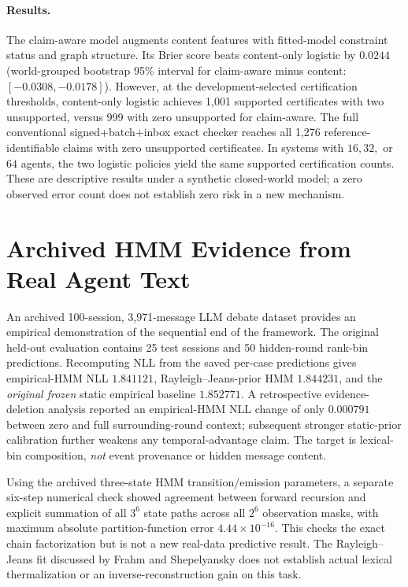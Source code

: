 \documentclass[10pt,twocolumn]{article}
\begin{document}
\paragraph{Results.} The claim-aware model augments content features with fitted-model constraint status and graph structure. Its Brier score beats content-only logistic by $0.0244$ (world-grouped bootstrap 95\% interval for claim-aware minus content: $[-0.0308,-0.0178]$). However, at the development-selected certification thresholds, content-only logistic achieves 1,001 supported certificates with two unsupported, versus 999 with zero unsupported for claim-aware. The full conventional signed+batch+inbox exact checker reaches all 1,276 reference-identifiable claims with zero unsupported certificates. In systems with $16,32,$ or $64$ agents, the two logistic policies yield the same supported certification counts. These are descriptive results under a synthetic closed-world model; a zero observed error count does not establish zero risk in a new mechanism.


\section{Archived HMM Evidence from Real Agent Text}
An archived 100-session, 3,971-message LLM debate dataset provides an empirical demonstration of the sequential end of the framework. The original held-out evaluation contains 25 test sessions and 50 hidden-round rank-bin predictions. Recomputing NLL from the saved per-case predictions gives empirical-HMM NLL $1.841121$, Rayleigh--Jeans-prior HMM $1.844231$, and the \emph{original frozen} static empirical baseline $1.852771$. A retrospective evidence-deletion analysis reported an empirical-HMM NLL change of only $0.000791$ between zero and full surrounding-round context; subsequent stronger static-prior calibration further weakens any temporal-advantage claim. The target is lexical-bin composition, \emph{not} event provenance or hidden message content.

Using the archived three-state HMM transition/emission parameters, a separate six-step numerical check showed agreement between forward recursion and explicit summation of all $3^6$ state paths across all $2^6$ observation masks, with maximum absolute partition-function error $4.44\times10^{-16}$. This checks the exact chain factorization but is not a new real-data predictive result. The Rayleigh--Jeans fit discussed by Frahm and Shepelyansky \cite{frahm2026} does not establish actual lexical thermalization or an inverse-reconstruction gain on this task.
\end{document}
